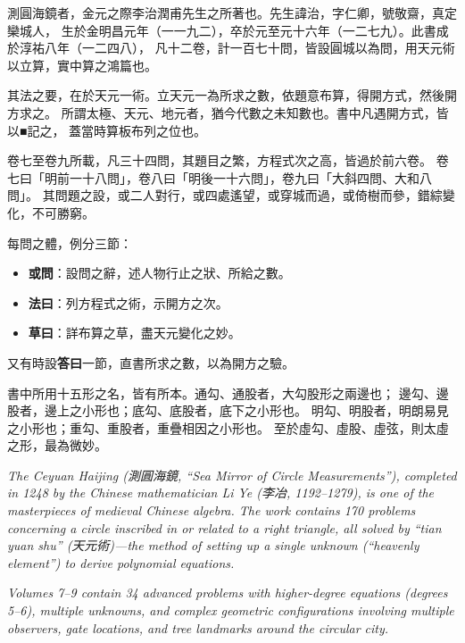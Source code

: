 \documentclass[11pt,a4paper]{article}
\begin{document}
\begin{tradfont}
測圓海鏡者，金元之際李治潤甫先生之所著也。先生諱治，字仁卿，號敬齋，真定欒城人，
生於金明昌元年（一一九二），卒於元至元十六年（一二七九）。此書成於淳祐八年（一二四八），
凡十二卷，計一百七十問，皆設圓城以為問，用天元術以立算，實中算之鴻篇也。

其法之要，在於天元一術。立天元一為所求之數，依題意布算，得開方式，然後開方求之。
所謂太極、天元、地元者，猶今代數之未知數也。書中凡遇開方式，皆以■記之，
蓋當時算板布列之位也。

卷七至卷九所載，凡三十四問，其題目之繁，方程式次之高，皆過於前六卷。
卷七曰「明前一十八問」，卷八曰「明後一十六問」，卷九曰「大斜四問、大和八問」。
其問題之設，或二人對行，或四處遙望，或穿城而過，或倚樹而參，錯綜變化，不可勝窮。

每問之體，例分三節：
\begin{itemize}[leftmargin=2em]
  \item \textbf{或問}：設問之辭，述人物行止之狀、所給之數。
  \item \textbf{法曰}：列方程式之術，示開方之次。
  \item \textbf{草曰}：詳布算之草，盡天元變化之妙。
\end{itemize}

又有時設\textbf{答曰}一節，直書所求之數，以為開方之驗。

書中所用十五形之名，皆有所本。通勾、通股者，大勾股形之兩邊也；
邊勾、邊股者，邊上之小形也；底勾、底股者，底下之小形也。
明勾、明股者，明朗易見之小形也；重勾、重股者，重疊相因之小形也。
至於虛勾、虛股、虛弦，則太虛之形，最為微妙。
\end{tradfont}

\vspace{0.5cm}
\noindent\textit{The \textit{Ceyuan Haijing} (測圓海鏡, ``Sea Mirror of Circle Measurements''),
completed in 1248 by the Chinese mathematician Li Ye (李冶, 1192--1279), is one
of the masterpieces of medieval Chinese algebra. The work contains 170 problems
concerning a circle inscribed in or related to a right triangle, all solved by
``tian yuan shu'' (天元術)---the method of setting up a single unknown
(``heavenly element'') to derive polynomial equations.}

\vspace{0.3cm}
\noindent\textit{Volumes 7--9 contain 34 advanced problems with higher-degree equations
(degrees 5--6), multiple unknowns, and complex geometric configurations involving
multiple observers, gate locations, and tree landmarks around the circular city.}
\end{document}
